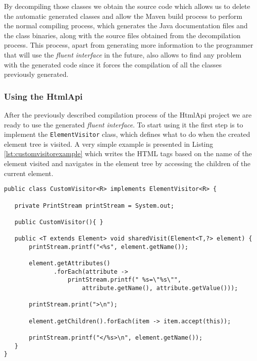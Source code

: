 \noindent
By decompiling those classes we obtain the source code which allows us to delete the automatic generated classes and allow the Maven build process to perform the normal compiling process, which generates the Java documentation files and the class binaries, along with the source files obtained from the decompilation process. This process, apart from generating more information to the programmer that will use the \textit{fluent interface} in the future, also allows to find any problem with the generated code since it forces the compilation of all the classes previously generated.

\subsubsection{Using the HtmlApi}

After the previously described compilation process of the HtmlApi project we are ready to use the generated \textit{fluent interface}. To start using it the first step is to implement the \texttt{ElementVisitor} class, which defines what to do when the created element tree is visited. A very simple example is presented in Listing \ref{lst:customvisitorexample} which writes the \ac{HTML} tags based on the name of the element visited and navigates in the element tree by accessing the children of the current element.

\bigskip


\begin{minipage}{\linewidth}
\begin{lstlisting}[caption={Custom Visitor},label={lst:customvisitorexample}]
public class CustomVisitor<R> implements ElementVisitor<R> {

   private PrintStream printStream = System.out;

   public CustomVisitor(){ }

   public <T extends Element> void sharedVisit(Element<T,?> element) {
       printStream.printf("<%s", element.getName());

       element.getAttributes()
              .forEach(attribute -> 
                  printStream.printf(" %s=\"%s\"", 
                      attribute.getName(), attribute.getValue()));

       printStream.print(">\n");

       element.getChildren().forEach(item -> item.accept(this));

       printStream.printf("</%s>\n", element.getName());
   }
}
\end{lstlisting}
\end{minipage}

